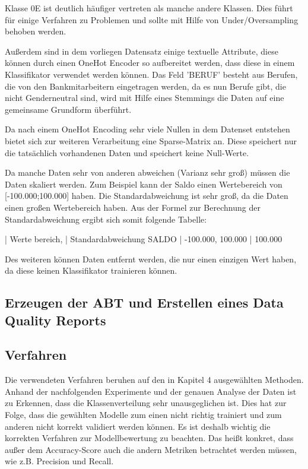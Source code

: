 Klasse 0E ist deutlich häufiger vertreten als manche andere Klassen. 
Dies führt für einige Verfahren zu Problemen und sollte mit Hilfe von Under/Oversampling behoben werden.

Außerdem sind in dem vorliegen Datensatz einige textuelle Attribute, diese können durch einen OneHot Encoder so aufbereitet werden, dass diese in einem Klassifikator verwendet werden können.
Das Feld 'BERUF' besteht aus Berufen, die von den Bankmitarbeitern eingetragen werden, da es nun Berufe gibt, die nicht Genderneutral sind, wird mit Hilfe eines Stemmings die Daten auf eine gemeinsame Grundform überführt.


Da nach einem OneHot Encoding sehr viele Nullen in dem Datenset entstehen bietet sich zur weiteren Verarbeitung eine Sparse-Matrix an.
Diese speichert nur die tatsächlich vorhandenen Daten und speichert keine Null-Werte. %

Da manche Daten sehr von anderen abweichen (Varianz sehr groß) müssen die Daten skaliert werden.
Zum Beispiel kann der Saldo einen Wertebereich von [-100.000;100.000] haben.
Die Standardabweichung ist sehr groß, da die Daten einen großen Wertebereich haben.
Aus der Formel zur Berechnung der Standardabweichung ergibt sich somit folgende Tabelle:

      | Werte bereich,      | Standardabweichung
SALDO | -100.000, 100.000   | 100.000


Des weiteren können Daten entfernt werden, die nur einen einzigen Wert haben, da diese keinen Klassifikator trainieren können.


\subsection{Erzeugen der ABT und Erstellen eines Data Quality Reports}

\subsection{Verfahren}
Die verwendeten Verfahren beruhen auf den in Kapitel 4 ausgewählten Methoden.
Anhand der nachfolgenden Experimente und der genauen Analyse der Daten ist zu Erkennen, dass die Klassenverteilung sehr unausgeglichen ist. 
Dies hat zur Folge, dass die gewählten Modelle zum einen nicht richtig trainiert und zum anderen nicht korrekt validiert werden können. 
Es ist deshalb wichtig die korrekten Verfahren zur Modellbewertung zu beachten.
Das heißt konkret, dass außer dem Accuracy-Score auch die andern Metriken betrachtet werden müssen, wie z.B. Precision und Recall.


